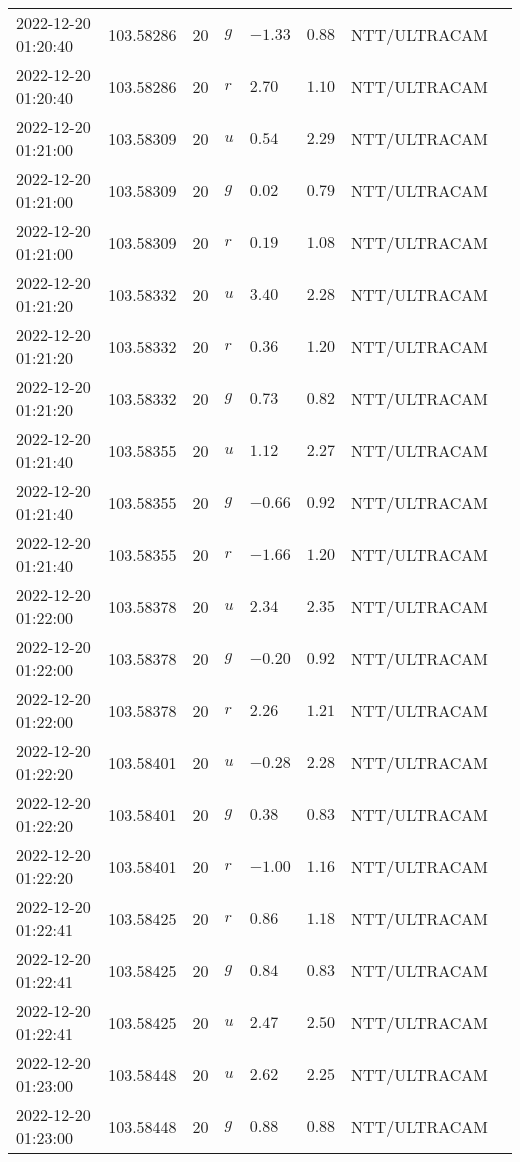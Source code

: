 \documentclass{nature_plusfigure}
\begin{document}
\begin{supplement}
\begin{center}
\begin{longtable}{llllllll}
2022-12-20 01:20:40 & 103.58286 & 20 & $g$ & $-1.33$ & $0.88$ & NTT/ULTRACAM &  \\ 
2022-12-20 01:20:40 & 103.58286 & 20 & $r$ & $2.70$ & $1.10$ & NTT/ULTRACAM &  \\ 
2022-12-20 01:21:00 & 103.58309 & 20 & $u$ & $0.54$ & $2.29$ & NTT/ULTRACAM &  \\ 
2022-12-20 01:21:00 & 103.58309 & 20 & $g$ & $0.02$ & $0.79$ & NTT/ULTRACAM &  \\ 
2022-12-20 01:21:00 & 103.58309 & 20 & $r$ & $0.19$ & $1.08$ & NTT/ULTRACAM &  \\ 
2022-12-20 01:21:20 & 103.58332 & 20 & $u$ & $3.40$ & $2.28$ & NTT/ULTRACAM &  \\ 
2022-12-20 01:21:20 & 103.58332 & 20 & $r$ & $0.36$ & $1.20$ & NTT/ULTRACAM &  \\ 
2022-12-20 01:21:20 & 103.58332 & 20 & $g$ & $0.73$ & $0.82$ & NTT/ULTRACAM &  \\ 
2022-12-20 01:21:40 & 103.58355 & 20 & $u$ & $1.12$ & $2.27$ & NTT/ULTRACAM &  \\ 
2022-12-20 01:21:40 & 103.58355 & 20 & $g$ & $-0.66$ & $0.92$ & NTT/ULTRACAM &  \\ 
2022-12-20 01:21:40 & 103.58355 & 20 & $r$ & $-1.66$ & $1.20$ & NTT/ULTRACAM &  \\ 
2022-12-20 01:22:00 & 103.58378 & 20 & $u$ & $2.34$ & $2.35$ & NTT/ULTRACAM &  \\ 
2022-12-20 01:22:00 & 103.58378 & 20 & $g$ & $-0.20$ & $0.92$ & NTT/ULTRACAM &  \\ 
2022-12-20 01:22:00 & 103.58378 & 20 & $r$ & $2.26$ & $1.21$ & NTT/ULTRACAM &  \\ 
2022-12-20 01:22:20 & 103.58401 & 20 & $u$ & $-0.28$ & $2.28$ & NTT/ULTRACAM &  \\ 
2022-12-20 01:22:20 & 103.58401 & 20 & $g$ & $0.38$ & $0.83$ & NTT/ULTRACAM &  \\ 
2022-12-20 01:22:20 & 103.58401 & 20 & $r$ & $-1.00$ & $1.16$ & NTT/ULTRACAM &  \\ 
2022-12-20 01:22:41 & 103.58425 & 20 & $r$ & $0.86$ & $1.18$ & NTT/ULTRACAM &  \\ 
2022-12-20 01:22:41 & 103.58425 & 20 & $g$ & $0.84$ & $0.83$ & NTT/ULTRACAM &  \\ 
2022-12-20 01:22:41 & 103.58425 & 20 & $u$ & $2.47$ & $2.50$ & NTT/ULTRACAM &  \\ 
2022-12-20 01:23:00 & 103.58448 & 20 & $u$ & $2.62$ & $2.25$ & NTT/ULTRACAM &  \\ 
2022-12-20 01:23:00 & 103.58448 & 20 & $g$ & $0.88$ & $0.88$ & NTT/ULTRACAM &  \\ 

\end{longtable}
\end{center}
\end{supplement}
\end{document}
